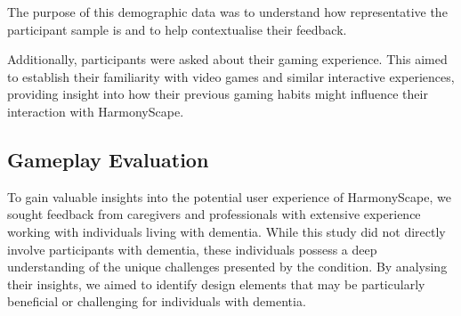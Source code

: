 \documentclass{l4proj}
\begin{document}
The purpose of this demographic data was to understand how representative the participant sample is and to help contextualise their feedback.

Additionally, participants were asked about their gaming experience. This aimed to establish their familiarity with video games and similar interactive experiences, providing insight into how their previous gaming habits might influence their interaction with HarmonyScape.

\subsection{Gameplay Evaluation}



To gain valuable insights into the potential user experience of HarmonyScape, we sought feedback from caregivers and professionals with extensive experience working with individuals living with dementia. While this study did not directly involve participants with dementia, these individuals possess a deep understanding of the unique challenges presented by the condition. By analysing their insights, we aimed to identify design elements that may be particularly beneficial or challenging for individuals with dementia.
\end{document}
